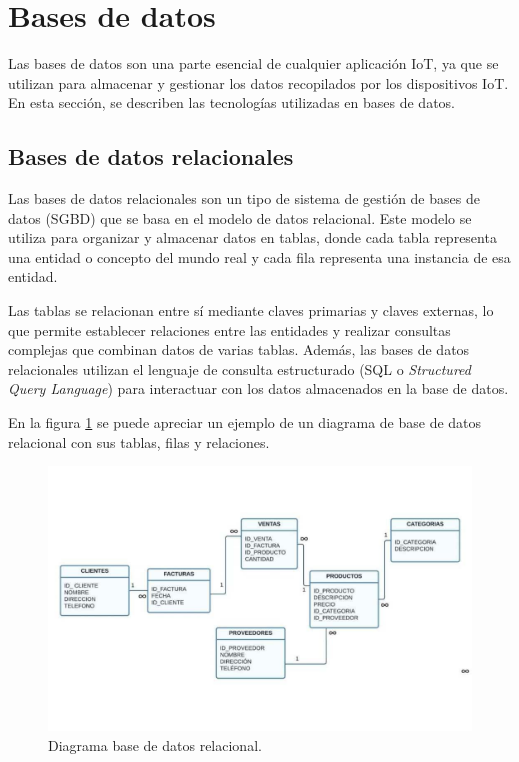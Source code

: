 \section{Bases de datos}
\label{sec:ddbb}

Las bases de datos son una parte esencial de cualquier aplicación IoT, ya que se utilizan para almacenar y gestionar los datos recopilados por los dispositivos IoT. En esta sección, se describen las tecnologías utilizadas en bases de datos.

\subsection{Bases de datos relacionales}
\label{subsec:RDBMS}

Las bases de datos relacionales son un tipo de sistema de gestión de bases de datos (SGBD) que se basa en el modelo de datos relacional. Este modelo se utiliza para organizar y almacenar datos en tablas, donde cada tabla representa una entidad o concepto del mundo real y cada fila representa una instancia de esa entidad.

Las tablas se relacionan entre sí mediante claves primarias y claves externas, lo que permite establecer relaciones entre las entidades y realizar consultas complejas que combinan datos de varias tablas. Además, las bases de datos relacionales utilizan el lenguaje de consulta estructurado (SQL o \textit{Structured Query Language}) para interactuar con los datos almacenados en la base de datos.

En la figura \ref{fig:relddbb} se puede apreciar un ejemplo de un diagrama de base de datos relacional con sus tablas, filas y relaciones.

\begin{figure}[ht]
	\centering
	\includegraphics[scale=.40]{./Figures/relddbb.jpg}
	\caption{Diagrama base de datos relacional.}
	\label{fig:relddbb}
\end{figure}

